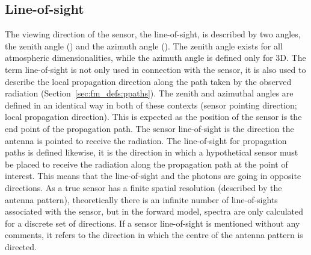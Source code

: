\subsection{Line-of-sight}
\label{sec:fm_defs:los}

The viewing direction of the sensor, the line-of-sight, is described
by two angles, the zenith angle (\ZntAng) and the azimuth angle
(\AzmAng). The zenith angle exists for all atmospheric
dimensionalities, while the azimuth angle is defined only for 3D.
The term line-of-sight is not only used in connection with the sensor,
it is also used to describe the local propagation direction along the
path taken by the observed radiation
(Section~\ref{sec:fm_defs:ppaths}).  The zenith and azimuthal angles
are defined in an identical way in both of these contexts (sensor
pointing direction; local propagation direction). This is expected as
the position of the sensor is the end point of the propagation path.
The sensor line-of-sight is the direction the antenna is pointed to
receive the radiation. The line-of-sight for propagation paths is
defined likewise, it is the direction in which a hypothetical sensor
must be placed to receive the radiation along the propagation path at
the point of interest. This means that the line-of-sight and the
photons are going in opposite directions. As a true sensor has a
finite spatial resolution (described by the antenna pattern),
theoretically there is an infinite number of line-of-sights associated
with the sensor, but in the forward model, spectra are only calculated
for a discrete set of directions. If a sensor line-of-sight is
mentioned without any comments, it refers to the direction in which
the centre of the antenna pattern is directed.

